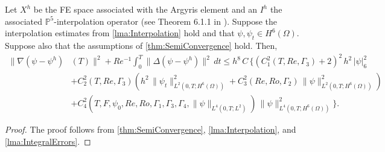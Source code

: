 \begin{thm} \label{thm:SemiInterp}
  Let $X^h$ be the FE space associated with the Argyris element and
  an $I^h$ the associated $\mathbb{P}^5$-interpolation operator (see Theorem
  6.1.1 in \cite{Ciarlet}).  Suppose the interpolation estimates from
  \autoref{lma:Interpolation} hold and that $\psi, \psi_t \in H^6(\Omega)$.
  Suppose also that the assumptions of \autoref{thm:SemiConvergence} hold.
  Then,
  \begin{equation}
    \begin{split}
      \|\nabla \left( \psi - \psi^h\right)&(T) \|^2
        + Re^{-1} \int_0^T\! \|\Delta \left(\psi - \psi^h\right)\|^2\, dt
        \le h^8\, C\, \biggl\{
        \left(C_1^2(T,Re,\Gamma_3) + 2\right)^2\, h^2\, |\psi|_6^2 \\
      & + C_2^2(T,Re,\Gamma_3) \left( h^2\,\|\psi_t\|_{L^2(0,T;H^6(\Omega))}^2
        + C_3^2(Re,Ro,\Gamma_2)\,\|\psi\|_{L^2(0,T;H^6(\Omega))}^2\right) \\
      & +
      C_4^2(T,F,\psi_0,Re,Ro,\Gamma_1,\Gamma_3,\Gamma_4,\|\psi\|_{L^4(0,T;L^2)})\,
        \|\psi\|_{L^4(0,T;H^6(\Omega))}^2 \biggr\}.
    \end{split}
    \label{eqn:SemiInterp}
  \end{equation}
\end{thm}
\begin{proof}
  The proof follows from \autoref{thm:SemiConvergence},
  \autoref{lma:Interpolation}, and \autoref{lma:IntegralErrors}.
\end{proof}
